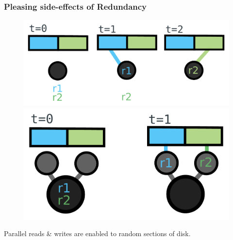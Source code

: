\documentclass{beamer}
\begin{document}
\begin{frame}
    \frametitle{Pleasing side-effects of Redundancy}
    \begin{figure}
    \includegraphics[width=0.5\paperwidth]{seq-reads.pdf}
    \includegraphics[width=0.5\paperwidth]{par-reads.pdf}
    \end{figure}
    Parallel reads \& writes are enabled to random sections of disk.
\end{frame}
\end{document}
